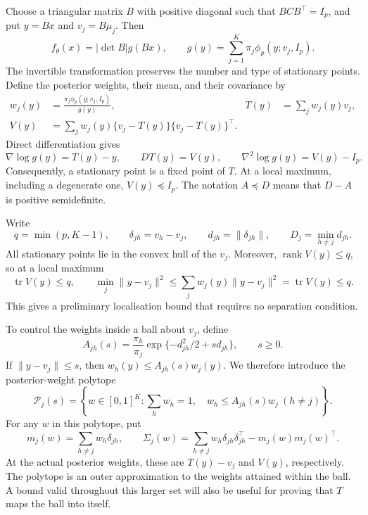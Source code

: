 \documentclass[12pt,a4paper]{article}
\theoremstyle{remark}
\DeclareMathOperator{\tr}{tr}
\DeclareMathOperator{\rank}{rank}
\begin{document}
Choose a triangular matrix $B$ with positive diagonal such that $BCB^\top=I_p$, and put $y=Bx$ and $v_j=B\mu_j$. Then
\[
 f_\theta(x)=|\det B|g(Bx),\qquad
 g(y)=\sum_{j=1}^K\pi_j\phi_p(y;v_j,I_p).
\]
The invertible transformation preserves the number and type of stationary points. Define the posterior weights, their mean, and their covariance by
\begin{align}
 w_j(y)&=\frac{\pi_j\phi_p(y;v_j,I_p)}{g(y)},&
 T(y)&=\sum_jw_j(y)v_j,\label{eq:posterior}\\
 V(y)&=\sum_jw_j(y)\{v_j-T(y)\}\{v_j-T(y)\}^{\top}.\nonumber
\end{align}
Direct differentiation gives
\begin{equation}\label{eq:derivatives}
 \nabla\log g(y)=T(y)-y,\qquad
 DT(y)=V(y),\qquad
 \nabla^2\log g(y)=V(y)-I_p.
\end{equation}
Consequently, a stationary point is a fixed point of $T$. At a local maximum, including a degenerate one, $V(y)\preceq I_p$. The notation $A\preceq D$ means that $D-A$ is positive semidefinite.

Write
\[
 q=\min(p,K-1),\qquad
 \delta_{jh}=v_h-v_j,\qquad d_{jh}=\|\delta_{jh}\|,
 \qquad D_j=\min_{h\ne j}d_{jh}.
\]
All stationary points lie in the convex hull of the $v_j$. Moreover, $\rank V(y)\le q$, so at a local maximum
\begin{equation}\label{eq:coarse}
 \tr V(y)\le q,\qquad
 \min_j\|y-v_j\|^2\le\sum_jw_j(y)\|y-v_j\|^2
 =\tr V(y)\le q.
\end{equation}
This gives a preliminary localisation bound that requires no separation condition.

To control the weights inside a ball about $v_j$, define
\begin{equation}\label{eq:odds}
 A_{jh}(s)=\frac{\pi_h}{\pi_j}
       \exp\{-d_{jh}^2/2+s d_{jh}\},\qquad s\ge0.
\end{equation}
If $\|y-v_j\|\le s$, then $w_h(y)\le A_{jh}(s)w_j(y)$. We therefore introduce the posterior-weight polytope
\begin{equation}\label{eq:polytope}
 \mathcal P_j(s)=\left\{w\in[0,1]^K:
       \sum_hw_h=1,\quad w_h\le A_{jh}(s)w_j\ (h\ne j)\right\}.
\end{equation}
For any $w$ in this polytope, put
\begin{equation}\label{eq:displacement}
 m_j(w)=\sum_{h\ne j}w_h\delta_{jh},\qquad
 \Sigma_j(w)=\sum_{h\ne j}w_h\delta_{jh}\delta_{jh}^{\top}
                  -m_j(w)m_j(w)^\top.
\end{equation}
At the actual posterior weights, these are $T(y)-v_j$ and $V(y)$, respectively. The polytope is an outer approximation to the weights attained within the ball. A bound valid throughout this larger set will also be useful for proving that $T$ maps the ball into itself.
\end{document}
